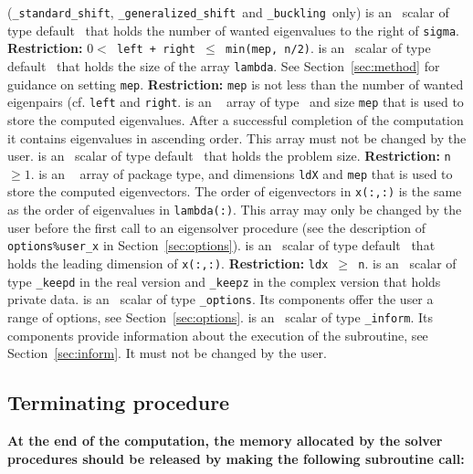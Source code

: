 \documentclass{spral}
\begin{document}
\begin{description}
%
({\tt \solver\_standard\_shift}, {\tt \solver\_generalized\_shift}\
and {\tt \solver\_buckling}\ only)
is an \intentin\ scalar of type default \Integer\ 
that holds the number of wanted eigenvalues to the right of {\tt sigma}.
{\bf Restriction:} {\tt $0 < $ left + right $\le$ min(mep, n/2)}.
%
\itt{mep} is an \intentin\ scalar of type default \Integer\ 
that holds the size of the array {\tt lambda}.
See Section~\ref{sec:method} for guidance on
setting {\tt mep}.
{\bf Restriction:} 
{\tt mep} is not less than the number of wanted eigenpairs
(cf. {\tt left} and {\tt right}.
%
\itt{lambda(:)} is an \intentinout\ %
array of type \REALDP\
and size {\tt mep} that is
used to store the computed eigenvalues.
After a successful completion of the computation
it contains eigenvalues in ascending order.
This array must not be changed by the user.
%
\itt{n} is an \intentin\ scalar of type default \Integer\ 
that holds the problem size.
{\bf Restriction:} {\tt n $\ge 1$}.
%
 is an \intentinout\ %
array of package type,
and dimensions {\tt ldX} and {\tt mep} that is
used to store the computed eigenvectors.
The order of eigenvectors in {\tt x(:,:)}
is the same as the order of eigenvalues in {\tt lambda(:)}.
This array may only be changed by the user
before the first call to an eigensolver procedure
(see the description of {\tt options\%user\_x} in Section~\ref{sec:options}).
%
\itt{ldx} is an \intentin\ scalar of type default \Integer\ 
that holds the leading dimension of {\tt x(:,:)}.
{\bf Restriction:} {\tt ldx $\ge$ n}.
%
\itt{keep} is an \intentinout\ scalar of type 
{\tt \solver\_keepd} in the real version and
{\tt \solver\_keepz} in the complex version
that holds private data. 
%
 is an \intentin\  scalar  of type {\tt \solver\_options}.
Its components offer the user a range of options,
see Section~\ref{sec:options}.
%
\itt{inform} is an \intentinout\ scalar of type 
{\tt \solver\_inform}. Its components provide information about the execution
of the subroutine, see Section~\ref{sec:inform}.
It must not be changed by the user.
%
\end{description}

\subsection{Terminating procedure}

{\bf
At the end of the computation, the memory 
allocated by the solver procedures
should be released
by making the following subroutine call:
}
\end{document}
